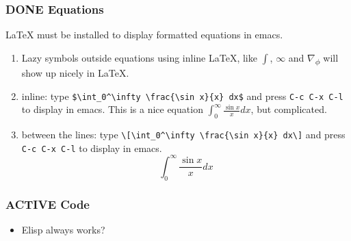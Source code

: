 \documentclass[11pt]{article}
\begin{document}
\subsubsection{{\bfseries\sffamily DONE} Equations}
\label{sec:org4d2fa87}
\LaTeX{} must be installed to display formatted equations in emacs.

\begin{enumerate}
\item Lazy symbols outside equations using inline \LaTeX, like \(\int\), \(\infty\) and \(\nabla\)\textsubscript{\(\phi\)} will show up nicely
in \LaTeX.

\item inline: type \texttt{\$\textbackslash{}int\_0\textasciicircum{}\textbackslash{}infty \textbackslash{}frac\{\textbackslash{}sin x\}\{x\} dx\$} and press \texttt{C-c C-x C-l} to display in emacs.
This is a nice equation \(\int_0^\infty \frac{\sin x}{x} dx\), but complicated.

\item between the lines: type \texttt{\textbackslash{}[\textbackslash{}int\_0\textasciicircum{}\textbackslash{}infty \textbackslash{}frac\{\textbackslash{}sin x\}\{x\} dx\textbackslash{}]} and press \texttt{C-c C-x C-l} to display in
emacs.
\[\int_0^\infty \frac{\sin x}{x} dx\]
\end{enumerate}

\subsubsection{{\bfseries\sffamily ACTIVE} Code}
\label{sec:org9b5e568}
\begin{itemize}
\item Elisp always works?
\end{itemize}
\end{document}
